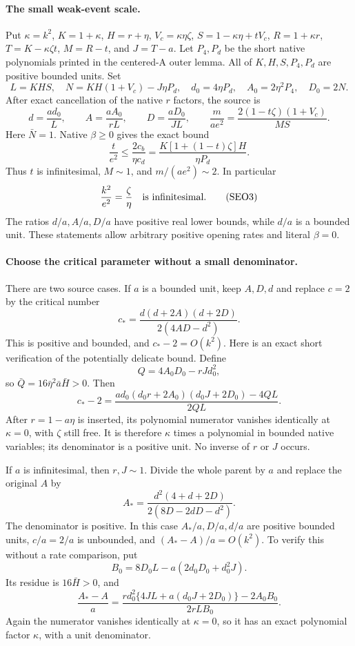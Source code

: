 \paragraph{The small weak-event scale.}
Put $\kappa=k^2$, $K=1+\kappa$, $H=r+\eta$,
$V_c=\kappa\eta\zeta$, $S=1-\kappa\eta+tV_c$,
$R=1+\kappa r$, $T=K-\kappa\zeta t$,
$M=R-t$, and $J=T-a$. Let $P_4,P_d$ be the short native
polynomials printed in the centered-A outer lemma. All of
$K,H,S,P_4,P_d$ are positive bounded units. Set
\[
 L=KHS,\quad N=KH(1+V_c)-J\eta P_d,\quad
 d_0=4\eta P_d,\quad A_0=2\eta^2P_4,\quad D_0=2N.
\]
After exact cancellation of the native $r$ factors, the source is
\[
 d=\frac{ad_0}{L},\qquad A=\frac{aA_0}{rL},\qquad
 D=\frac{aD_0}{JL},\qquad
 \frac{m}{ae^2}=
 \frac{2(1-t\zeta)(1+V_c)}{MS}.                 \tag{SEO2}
\]
Here $\bar N=1$. Native $\beta\ge0$ gives the exact bound
\[
 \frac{t}{e^2}\le\frac{2c_b}{\eta c_d}
 =\frac{K[1+(1-t)\zeta]H}{\eta P_d}.
\]
Thus $t$ is infinitesimal, $M\sim1$, and $m/(ae^2)\sim2$.
In particular
\[
 \frac{k^2}{e^2}=\frac\zeta\eta
 \quad\hbox{is infinitesimal}.                       \tag{SEO3}
\]
The ratios $d/a,A/a,D/a$ have positive real lower bounds, while
$d/a$ is a bounded unit. These statements allow arbitrary positive
opening rates and literal $\beta=0$.

\paragraph{Choose the critical parameter without a small denominator.}
There are two source cases. If $a$ is a bounded unit, keep $A,D,d$
and replace $c=2$ by the critical number
\[
 c_* =\frac{d(d+2A)(d+2D)}{2(4AD-d^2)}.
 \tag{SEO4}
\]
This is positive and bounded, and $c_*-2=O(k^2)$.
Here is an exact short verification of the potentially delicate bound.
Define
\[
 Q=4A_0D_0-rJd_0^2,
\]
so $\bar Q=16\bar\eta^2\bar a\bar H>0$. Then
\[
 c_*-2=
 \frac{ad_0(d_0r+2A_0)(d_0J+2D_0)-4QL}{2QL}.
 \tag{SEO5}
\]
After $r=1-a\eta$ is inserted, its polynomial numerator vanishes
identically at $\kappa=0$, with $\zeta$ still free. It is therefore
$\kappa$ times a polynomial in bounded native variables; its
denominator is a positive unit. No inverse of $r$ or $J$ occurs.

If $a$ is infinitesimal, then $r,J\sim1$. Divide the whole parent
by $a$ and replace the original $A$ by
\[
 A_* =\frac{d^2(4+d+2D)}{2(8D-2dD-d^2)}.       \tag{SEO6}
\]
The denominator is positive. In this case
$A_*/a,D/a,d/a$ are positive bounded units, $c/a=2/a$ is
unbounded, and $(A_*-A)/a=O(k^2)$. To verify this without a
rate comparison, put
\[
 B_0=8D_0L-a(2d_0D_0+d_0^2J).
\]
Its residue is $16\bar H>0$, and
\[
 \frac{A_*-A}{a}=
 \frac{r d_0^2\{4JL+a(d_0J+2D_0)\}-2A_0B_0}
 {2rLB_0}.                                           \tag{SEO7}
\]
Again the numerator vanishes identically at $\kappa=0$, so it has
an exact polynomial factor $\kappa$, with a unit denominator.

